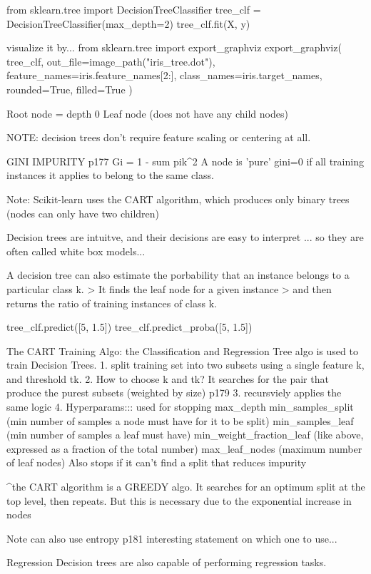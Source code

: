 from sklearn.tree import DecisionTreeClassifier
tree_clf = DecisionTreeClassifier(max_depth=2)
tree_clf.fit(X, y)

visualize it by...
from sklearn.tree import export_graphviz
export_graphviz(
    tree_clf,
    out_file=image_path("iris_tree.dot"),
    feature_names=iris.feature_names[2:],
    class_names=iris.target_names,
    rounded=True,
    filled=True
)

Root node = depth 0
Leaf node (does not have any child nodes)

NOTE:
decision trees don't require feature scaling or centering at all.

GINI IMPURITY
p177
Gi = 1 - sum pik^2
A node is 'pure' gini=0
if all training instances it applies to belong to the same class.

Note:
Scikit-learn uses the CART algorithm,
which produces only binary trees (nodes can only have two children)

Decision trees are intuitve,
and their decisions are easy to interpret
... so they are often called white box models...

A decision tree can also estimate the porbability
that an instance belongs to a particular class k.
> It finds the leaf node for a given instance
> and then returns the ratio of training instances of class k.

tree_clf.predict([5, 1.5]) 
tree_clf.predict_proba([5, 1.5])

The CART Training Algo:
the Classification and Regression Tree algo is used to train Decision Trees.
1. split training set into two subsets using a single feature k, and threshold tk.
2. How to choose k and tk?
It searches for the pair that produce the purest subsets (weighted by size)
p179
3. recursviely applies the same logic
4. Hyperparams::: used for stopping
max_depth
min_samples_split (min number of samples a node must have for it to be split)
min_samples_leaf (min number of samples a leaf must have)
min_weight_fraction_leaf (like above, expressed as a fraction of the total number)
max_leaf_nodes (maximum number of leaf nodes)
Also stops if it can't find a split that reduces impurity

^the CART algorithm is a GREEDY algo.
It searches for an optimum split at the top level, then repeats.
But this is necessary due to the exponential increase in nodes

Note can also use entropy p181
interesting statement on which one to use...

Regression
Decision trees are also capable of performing regression tasks.

